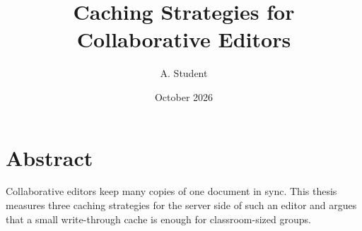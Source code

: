 \documentclass[11pt,a4paper]{book}
\title{Caching Strategies for Collaborative Editors}
\author{A. Student}
\date{October 2026}
\begin{document}
\frontmatter
\maketitle

\chapter*{Abstract}
Collaborative editors keep many copies of one document in sync. This thesis
measures three caching strategies for the server side of such an editor and
argues that a small write-through cache is enough for classroom-sized groups.

\tableofcontents
\listoffigures

\mainmatter





\backmatter


\end{document}
